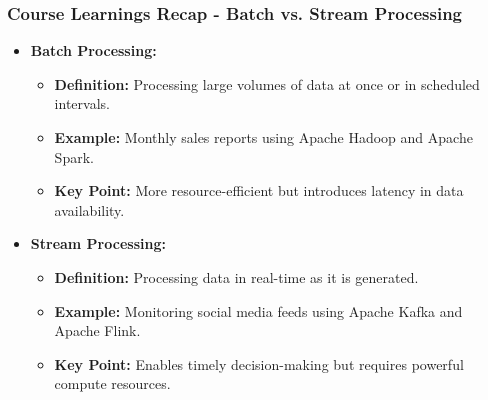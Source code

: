 \documentclass{beamer}
\begin{document}
\begin{frame}[fragile]
    \frametitle{Course Learnings Recap - Batch vs. Stream Processing}
    \begin{itemize}
        \item \textbf{Batch Processing:}
            \begin{itemize}
                \item \textbf{Definition:} Processing large volumes of data at once or in scheduled intervals.
                \item \textbf{Example:} Monthly sales reports using Apache Hadoop and Apache Spark.
                \item \textbf{Key Point:} More resource-efficient but introduces latency in data availability.
            \end{itemize}
        \item \textbf{Stream Processing:}
            \begin{itemize}
                \item \textbf{Definition:} Processing data in real-time as it is generated.
                \item \textbf{Example:} Monitoring social media feeds using Apache Kafka and Apache Flink.
                \item \textbf{Key Point:} Enables timely decision-making but requires powerful compute resources.
            \end{itemize}
    \end{itemize}
\end{frame}
\end{document}

